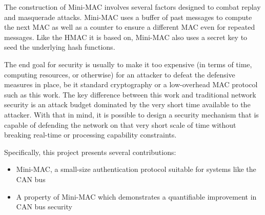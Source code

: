 The construction of Mini-MAC involves several factors designed to combat replay and masquerade attacks. Mini-MAC uses a buffer of past messages to compute the next MAC as well as a counter to ensure a different MAC even for repeated messages. Like the HMAC it is based on, Mini-MAC also uses a secret key to seed the underlying hash functions.



The end goal for security is usually to make it too expensive (in terms of time, computing resources, or otherwise) for an attacker to defeat the defensive measures in place, be it standard cryptography or a low-overhead MAC protocol such as this work. The key difference between this work and traditional network security is an attack budget dominated by the very short time available to the attacker. With that in mind, it is possible to design a security mechanism that is capable of defending the network on that very short scale of time without breaking real-time or processing capability constraints.

Specifically, this project presents several contributions:
\begin{itemize}
\item Mini-MAC, a small-size authentication protocol suitable for systems like the CAN bus
\item A property of Mini-MAC which demonstrates a quantifiable improvement in CAN bus security
\end{itemize}